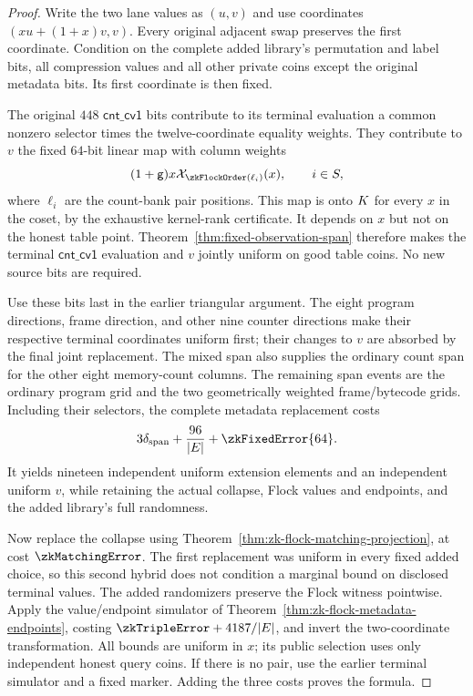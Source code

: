 \begin{proof}
Write the two lane values as $(u,v)$ and use coordinates $(xu+(1+x)v,v)$. Every original adjacent swap preserves the first coordinate. Condition on the complete added library's permutation and label bits, all compression values and all other private coins except the original metadata bits. Its first coordinate is then fixed.

The original $448$ $\mathsf{cnt\_cv1}$ bits contribute to its terminal evaluation a common nonzero selector times the twelve-coordinate equality weights. They contribute to $v$ the fixed $64$-bit linear map with column weights
\[
 (1+\gen)x\novel_{\zkFlockOrder(\ell_i)}(x),\qquad i\in S,
\]
where $\ell_i$ are the count-bank pair positions. This map is onto $K$ for every $x$ in the coset, by the exhaustive kernel-rank certificate. It depends on $x$ but not on the honest table point. Theorem~\ref{thm:fixed-observation-span} therefore makes the terminal $\mathsf{cnt\_cv1}$ evaluation and $v$ jointly uniform on good table coins. No new source bits are required.

Use these bits last in the earlier triangular argument. The eight program directions, frame direction, and other nine counter directions make their respective terminal coordinates uniform first; their changes to $v$ are absorbed by the final joint replacement. The mixed span also supplies the ordinary count span for the other eight memory-count columns. The remaining span events are the ordinary program grid and the two geometrically weighted frame/bytecode grids. Including their selectors, the complete metadata replacement costs
\[
 3\delta_{\mathrm{span}}+\frac{96}{|\E|}+\zkFixedError{64}.
\]
It yields nineteen independent uniform extension elements and an independent uniform $v$, while retaining the actual collapse, Flock values and endpoints, and the added library's full randomness.

Now replace the collapse using Theorem~\ref{thm:zk-flock-matching-projection}, at cost $\zkMatchingError$. The first replacement was uniform in every fixed added choice, so this second hybrid does not condition a marginal bound on disclosed terminal values. The added randomizers preserve the Flock witness pointwise. Apply the value/endpoint simulator of Theorem~\ref{thm:zk-flock-metadata-endpoints}, costing $\zkTripleError+4187/|\E|$, and invert the two-coordinate transformation. All bounds are uniform in $x$; its public selection uses only independent honest query coins. If there is no pair, use the earlier terminal simulator and a fixed marker. Adding the three costs proves the formula.
\end{proof}

